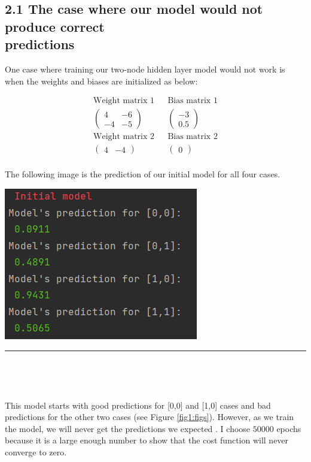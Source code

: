 \documentclass[12pt,english,]{article}
\newcommand{\mtx}[1]{\begin{pmatrix}#1\end{pmatrix}} %
\let\origfigure\figure
\let\endorigfigure\endfigure
\renewenvironment{figure}[1][2] {
    \expandafter\origfigure\expandafter[H]
} {
    \endorigfigure
}
\begin{document}
\hypertarget{section2.1}{%
\subsection{\texorpdfstring{2.1 \enspace The case where our model would not produce correct \\ predictions}{2.1 The case where our model would not produce correct predictions}}\label{section2.1}}

One case where training our two-node hidden layer model would not work is when the weights and biases are initialized as below:

\begin{align*}
\text{Weight matrix 1} &&\text{Bias matrix 1} \\
\mtx{4 & -6\\  -4 & -5} &&\mtx{-3 \\ 0.5}\\
\text{Weight matrix 2} &&\text{Bias matrix 2}\\
\mtx{4 & -4} &&\mtx{0}\\
\end{align*}

The following image is the prediction of our initial model for all four cases.

\begin{figure}

{\centering \includegraphics[width=0.7\linewidth]{images/initial_pred} 

}

\caption{\label{fig1:figs}The predictions of the initial model.}\label{fig:unnamed-chunk-1}
\end{figure}

\hrule

~

~

This model starts with good predictions for [0,0] and [1,0] cases and bad predictions for the other two cases (see Figure \ref{fig1:figs}). However, as we train the model, we will never get the predictions we expected . I choose $50000$ epochs because it is a large enough number to show that the cost function will never converge to zero.
\end{document}
